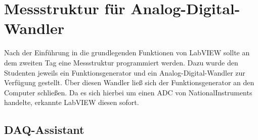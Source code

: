 \section{Messstruktur für Analog-Digital-Wandler}
	
Nach der Einführung in die grundlegenden Funktionen von LabVIEW sollte an dem zweiten Tag eine Messstruktur programmiert werden.
Dazu wurde den Studenten jeweils ein Funktionsgenerator und ein Analog-Digital-Wandler zur Verfügung gestellt.
Über diesen Wandler ließ sich der Funktionsgenerator an den Computer schließen.
Da es sich hierbei um einen ADC von NationalInstruments handelte, erkannte LabVIEW diesen sofort.


\subsection{DAQ-Assistant}

